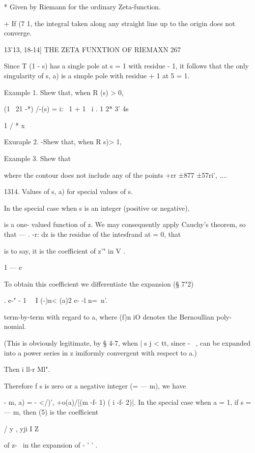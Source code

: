 * Given by Riemann for the ordinary Zeta-function.

+ If (7 1, the integral taken along any straight line up to the origin
does not converge.



13'13, 18-14] THE ZETA FUNXTION OF RIEMAXN 267

Since T (1 - s) has a single pole at s = 1 with residue - 1, it
follows that the only singularity of s, a) is a simple pole with
residue + 1 at 5 = 1.

Example 1. Shew that, when R (s) > 0,

(1 \ 21 -*) /-(s) = i: \ 1 + 1 \ i . 1 2* 3' 4s ~



1 / * x ~



Exuraple 2. -Shew that, when R s)> 1,

Example 3. Shew that

where the contour does not include any of the points +rr ±877 ±57ri',
....

1314. Values of s, a) for special values of s.

In the special case when s is an integer (positive or negative),

is a one- valued function of z. We may consequently apply Cauchy's
theorem, so that — . -r: dz is the residue of the intesfrand at = 0,
that

is to say, it is the coefficient of z'" in V .

1 — e~

To obtain this coefficient we differentiate the expansion (§ 7"2)

. e-" - 1 \ \ I (-)n< (a)2 e- -l n=\ n'.

term-by-term with regard to a, where (f)n iO denotes the Bernoullian
poly- nomial.

(This is obviously legitimate, by § 4-7, when | s j < tt, since - \ ,
can be expanded into a power series in z imiformly convergent with
respect to a.)

Then i ll-r Ml".

Therefore f s is zero or a negative integer (= — m), we have

  - m, a) = - </)', +o(a)/[(m -f- 1) ( i -f- 2)|. In the special case
when a = 1, if s = — m, then (5) is the coefficient

/ y , yji I Z

of z-~ in the expansion of - ' ' .



